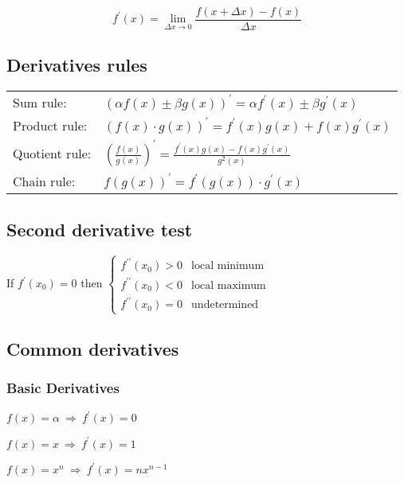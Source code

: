 \[
f^\prime(x) = \lim_{\Delta x \rightarrow 0} \frac{ f( x + \Delta x ) - f(x) }{\Delta x}
\]

\subsection{Derivatives rules}
\begin{tabular}{ l l }
Sum rule:      & $ \displaystyle (\alpha f(x) \pm \beta g(x) )^\prime = \alpha f^\prime(x) \pm \beta g^\prime(x) $  \\
Product rule:  & $ \displaystyle (f(x) \cdot g(x) )^\prime = f^\prime(x) g(x) + f(x) g^\prime(x) $ \\
Quotient rule: & $ \displaystyle \left( \frac{f(x)}{g(x)} \right)^\prime = \frac{ f^\prime(x) g(x) - f(x) g^\prime(x) }{ g^2(x) } $ \\
Chain rule:    & $ \displaystyle f\left( g(x) \right) ^\prime = f^\prime\left( g(x) \right) \cdot g^\prime(x) $
\end{tabular}


\subsection{Second derivative test}

If $ f^\prime(x_0) = 0 $ then $ \begin{cases}
									f^{\prime\prime}(x_0) > 0 & \text{local minimum} \\
									f^{\prime\prime}(x_0) < 0 & \text{local maximum} \\
									f^{\prime\prime}(x_0) = 0 & \text{undetermined}
								\end{cases}
$

\subsection{Common derivatives}
\subsubsection{Basic Derivatives}
$ \displaystyle f(x)=\alpha ~ \Rightarrow ~ f^\prime(x)=0 $

$ \displaystyle f(x)=x ~ \Rightarrow ~ f^\prime(x)=1 $

$ \displaystyle f(x)=x^n ~ \Rightarrow ~ f^\prime(x)=n x^{n-1} $

